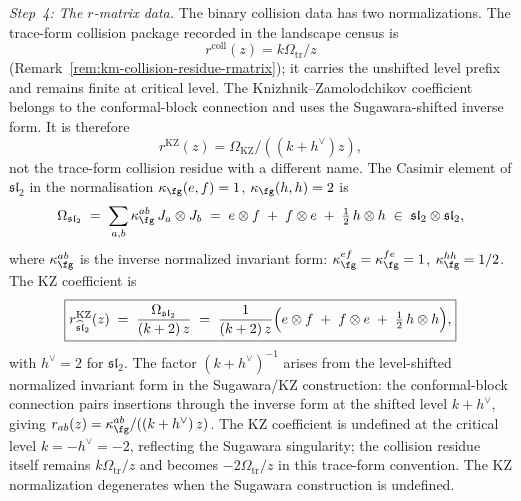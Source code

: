 \begin{computation}
\emph{Step~4: The $r$-matrix data.}
The binary collision data has two normalizations.  The trace-form
collision package recorded in the landscape census is
\[
r^{\mathrm{coll}}(z)=k\Omega_{\mathrm{tr}}/z
\]
(Remark~\ref{rem:km-collision-residue-rmatrix}); it carries the
unshifted level prefix and remains finite at critical level.  The
Knizhnik--Zamolodchikov coefficient belongs to the conformal-block
connection and uses the Sugawara-shifted inverse form.  It is
therefore
\[
r^{\mathrm{KZ}}(z)=\Omega_{\mathrm{KZ}}/((k+h^\vee)z),
\]
not the trace-form collision residue with a different name.  The
Casimir element of
$\mathfrak{sl}_2$ in the normalisation
$\kappa_{\fg}(e,f) = 1$, $\kappa_{\fg}(h,h) = 2$ is
\begin{equation}\label{eq:sl2-casimir-explicit}
\Omega_{\mathfrak{sl}_2}
\;=\;
\sum_{a,b} \kappa_{\fg}^{ab}\, J_a \otimes J_b
\;=\;
e \otimes f \;+\; f \otimes e \;+\;
\tfrac{1}{2}\, h \otimes h
\;\in\;
\mathfrak{sl}_2 \otimes \mathfrak{sl}_2,
\end{equation}
where $\kappa_{\fg}^{ab}$ is the inverse normalized invariant form:
$\kappa_{\fg}^{ef} = \kappa_{\fg}^{fe} = 1$,
$\kappa_{\fg}^{hh} = 1/2$.
The KZ coefficient is
\begin{equation}\label{eq:sl2-r-matrix-explicit}
\boxed{
r^{\mathrm{KZ}}_{\widehat{\mathfrak{sl}}_2}(z)
\;=\;
\frac{\Omega_{\mathfrak{sl}_2}}{(k + 2)\,z}
\;=\;
\frac{1}{(k+2)\,z}
\Bigl(
e \otimes f \;+\; f \otimes e \;+\;
\tfrac{1}{2}\, h \otimes h
\Bigr),
}
\end{equation}
with $h^\vee = 2$ for $\mathfrak{sl}_2$.
The factor $(k + h^\vee)^{-1}$ arises from the level-shifted
normalized invariant form in the Sugawara/KZ construction: the conformal-block
connection pairs insertions through the inverse form at the shifted
level $k + h^\vee$, giving
$r_{ab}(z) = \kappa_{\fg}^{ab}/((k + h^\vee)\,z)$.
The KZ coefficient is undefined at the critical level
$k = -h^\vee = -2$, reflecting the Sugawara singularity; the
collision residue itself remains $k\Omega_{\mathrm{tr}}/z$ and becomes
$-2\Omega_{\mathrm{tr}}/z$ in this trace-form convention. The KZ
normalization degenerates
when the Sugawara construction is undefined.


\end{computation}
